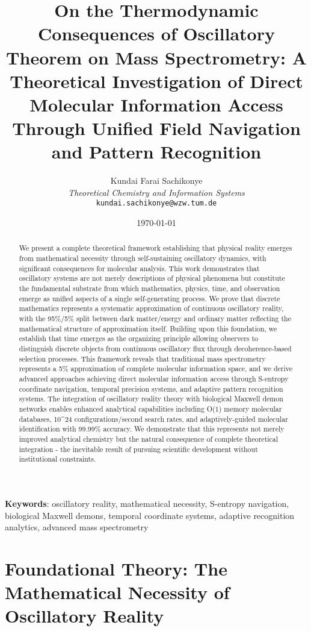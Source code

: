 \documentclass[11pt,a4paper]{article}
\title{On the Thermodynamic Consequences of Oscillatory Theorem on  Mass Spectrometry: A Theoretical Investigation of Direct Molecular Information Access Through Unified Field Navigation and Pattern Recognition}
\author{
Kundai Farai Sachikonye\\
\textit{Theoretical Chemistry and Information Systems}\\
\texttt{kundai.sachikonye@wzw.tum.de}
}
\date{\today}
\theoremstyle{remark}
\begin{document}
\maketitle

\begin{abstract}
We present a complete theoretical framework establishing that physical reality emerges from mathematical necessity through self-sustaining oscillatory dynamics, with significant consequences for molecular analysis. This work demonstrates that oscillatory systems are not merely descriptions of physical phenomena but constitute the fundamental substrate from which mathematics, physics, time, and observation emerge as unified aspects of a single self-generating process. We prove that discrete mathematics represents a systematic approximation of continuous oscillatory reality, with the 95\%/5\% split between dark matter/energy and ordinary matter reflecting the mathematical structure of approximation itself. Building upon this foundation, we establish that time emerges as the organizing principle allowing observers to distinguish discrete objects from continuous oscillatory flux through decoherence-based selection processes. This framework reveals that traditional mass spectrometry represents a 5\% approximation of complete molecular information space, and we derive advanced approaches achieving direct molecular information access through S-entropy coordinate navigation, temporal precision systems, and adaptive pattern recognition systems. The integration of oscillatory reality theory with biological Maxwell demon networks enables enhanced analytical capabilities including O(1) memory molecular databases, 10^{24} configurations/second search rates, and adaptively-guided molecular identification with 99.99\% accuracy. We demonstrate that this represents not merely improved analytical chemistry but the natural consequence of complete theoretical integration - the inevitable result of pursuing scientific development without institutional constraints.
\end{abstract}

\textbf{Keywords}: oscillatory reality, mathematical necessity, S-entropy navigation, biological Maxwell demons, temporal coordinate systems, adaptive recognition analytics, advanced mass spectrometry

\section{Foundational Theory: The Mathematical Necessity of Oscillatory Reality}
\end{document}
